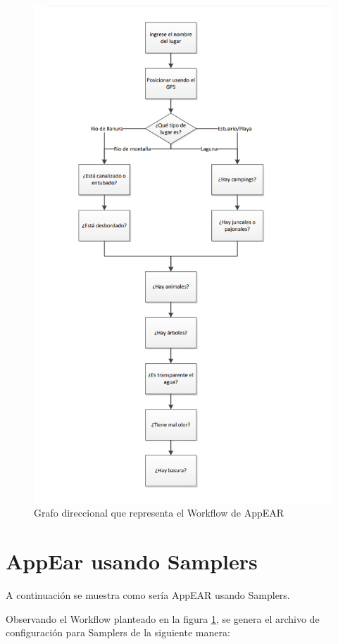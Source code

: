 \begin{figure}[H] \label{img_grafo_appear}
  \centering
   \includegraphics[scale=0.65]{06-caso_de_uso/flujo_appear.png} 
    \caption{Grafo direccional que representa el Workflow de AppEAR}
\end{figure}

\section{AppEar usando Samplers}
A continuación se muestra como sería AppEAR usando Samplers.

Observando el Workflow planteado en la figura \ref{img_grafo_appear}, se genera el archivo de configuración para Samplers de la siguiente manera:

